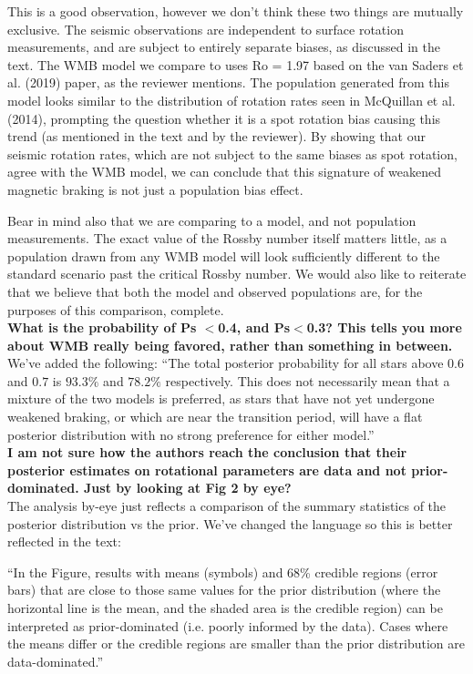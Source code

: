 \documentclass[11pt]{article}
\begin{document}
This is a good observation, however we don’t think these two things are mutually exclusive. The seismic observations are independent to surface rotation measurements, and are subject to entirely separate biases, as discussed in the text. The WMB model we compare to uses Ro = 1.97 based on the van Saders et al. (2019) paper, as the reviewer mentions. The population generated from this model looks similar to the distribution of rotation rates seen in McQuillan et al. (2014), prompting the question whether it is a spot rotation bias causing this trend (as mentioned in the text and by the reviewer). By showing that our seismic rotation rates, which are not subject to the same biases as spot rotation, agree with the WMB model, we can conclude that this signature of weakened magnetic braking is not just a population bias effect.

Bear in mind also that we are comparing to a model, and not population measurements. The exact value of the Rossby number itself matters little, as a population drawn from any WMB model will look sufficiently different to the standard scenario past the critical Rossby number. We would also like to reiterate that we believe that both the model and observed populations are, for the purposes of this comparison, complete.\\

\noindent\textbf{What is the probability of Ps $<$0.4, and Ps$<$0.3? This tells you more about WMB really being favored, rather than something in between.}\\

We’ve added the following: “The total posterior probability for all stars above $0.6$ and $0.7$ is $93.3\%$ and $78.2\%$  respectively. This does not necessarily mean that a mixture of the two models is preferred, as stars that have not yet undergone weakened braking, or which are near the transition period, will have a flat posterior distribution with no strong preference for either model.”\\

\noindent\textbf{I am not sure how the authors reach the conclusion that their posterior estimates on rotational parameters are data and not prior-dominated. Just by looking at Fig 2 by eye?}\\

The analysis by-eye just reflects a comparison of the summary statistics of the posterior distribution vs the prior. We’ve changed the language so this is better reflected in the text:

“In the Figure, results with means (symbols) and 68\% credible regions (error bars) that are close to those same values for the prior distribution (where the horizontal line is the mean, and the shaded area is the credible region) can be interpreted as prior-dominated (i.e. poorly informed by the data). Cases where the means differ or the credible regions are smaller than the prior distribution are data-dominated.”
\end{document}
